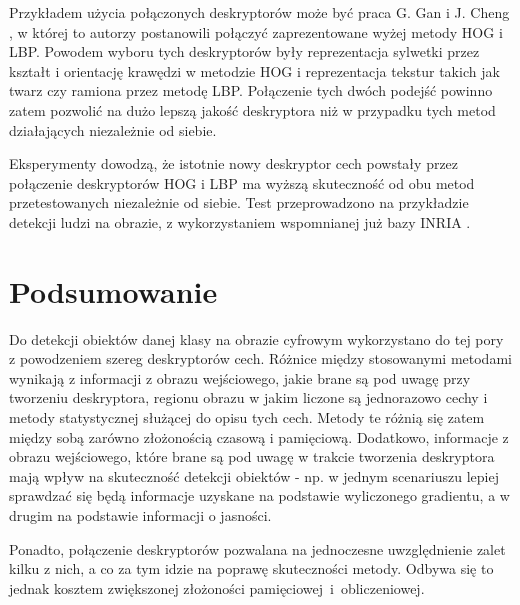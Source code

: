 Przykładem użycia połączonych deskryptorów może być praca G. Gan i J. Cheng \cite{Gan11}, w której to autorzy postanowili połączyć zaprezentowane wyżej metody HOG i LBP.
Powodem wyboru tych deskryptorów były reprezentacja sylwetki przez kształt i orientację krawędzi w metodzie HOG i reprezentacja tekstur takich jak twarz czy ramiona przez metodę LBP. Połączenie tych dwóch podejść powinno zatem pozwolić na dużo lepszą jakość deskryptora niż w przypadku tych metod działających niezależnie od siebie.

Eksperymenty dowodzą, że istotnie nowy deskryptor cech powstały przez połączenie deskryptorów HOG i LBP ma wyższą skuteczność od obu metod przetestowanych niezależnie od siebie.
Test przeprowadzono na przykładzie detekcji ludzi na obrazie, z wykorzystaniem wspomnianej już bazy INRIA \cite{INRIA_set}.

\section{Podsumowanie}
\label{sec:podsumowaniePrace}

Do detekcji obiektów danej klasy na obrazie cyfrowym wykorzystano do tej pory z powodzeniem szereg deskryptorów cech. Różnice między stosowanymi metodami wynikają z informacji z obrazu wejściowego, jakie brane są pod uwagę przy tworzeniu deskryptora, regionu obrazu w jakim liczone są jednorazowo cechy i metody statystycznej służącej do opisu tych cech.
Metody te różnią się zatem między sobą zarówno złożonością czasową i pamięciową.
Dodatkowo, informacje z obrazu wejściowego, które brane są pod uwagę w trakcie tworzenia deskryptora mają wpływ na skuteczność detekcji obiektów - np. w jednym scenariuszu lepiej sprawdzać się będą informacje uzyskane na podstawie wyliczonego gradientu, a w drugim na podstawie informacji o jasności.

Ponadto, połączenie deskryptorów pozwalana na jednoczesne uwzględnienie zalet kilku z nich, a co za tym idzie na poprawę skuteczności metody. Odbywa się to jednak kosztem zwiększonej złożoności pamięciowej~i~obliczeniowej.

